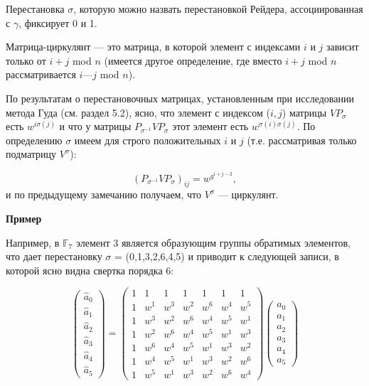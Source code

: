 \documentclass{mai_book}
\begin{document}
\begin{mynotice}
Перестановка $\sigma$, которую можно назвать перестановкой Рейдера, ассоциированная с $\gamma$, фиксирует 0 и 1.\par
Матрица-циркулянт --- это матрица, в которой элемент с индексами $i$ и $j$ зависит только от $i + j$ mod $n$ (имеется другое определение, где вместо $i + j$ mod $n$ рассматривается $i — j$ mod $n$).
\end{mynotice}
\par 
\begin{myproof}
По результатам о перестановочных матрицах, установленным при исследовании метода Гуда (см. раздел 5.2), ясно, что элемент с индексом ($i,j$) матрицы $VP_{\sigma}$ есть $w^{i \sigma (j)}$ и что у матрицы $P_{\sigma^{-1}}VP_{\sigma}$ этот элемент есть $w^{\sigma (i) \sigma (j)}$. По определению $\sigma$ имеем для строго положительных $i$ и $j$ (т.е. рассматривая только подматрицу $V^{\sigma}$):\par 
$$(P_{\sigma^{-1}}VP_{\sigma})_{ij}=w^{g^{i+j-2}},$$ и по предыдущему замечанию получаем, что $V^{\sigma}$ --- циркулянт.
\end{myproof}
\begin{beznomera}
  \textbf{Пример}
  \end{beznomera}
Например, в $\mathbb{F}_7$ элемент 3 является образующим группы обратимых элементов, что дает перестановку $\sigma$ = (0,1,3,2,6,4,5) и приводит к следующей записи, в которой ясно видна свертка порядка 6:\par
$$ \begin{pmatrix}
  \hat{a}_0 \\ \hat{a}_1 \\ \hat{a}_2 \\ \hat{a}_3 \\ \hat{a}_4 \\ \hat{a}_5 \end{pmatrix} = \begin{pmatrix} 1 & 1 & 1 & 1 & 1 & 1 & 1 \\ 1 & w^1 & w^3 & w^2 & w^6 & w^4 & w^5 \\ 1 & w^3 & w^2 & w^6 & w^4 & w^5 & w^1 \\ 1 & w^2 & w^6 & w^4 & w^5 & w^1 & w^3 \\ 1 & w^6 & w^4 & w^5 & w^1 & w^3 & w^2 \\ 1 & w^4 & w^5 & w^1 & w^3 & w^2 & w^6 \\ 1 & w^5 & w^1 & w^3 & w^2 & w^6 & w^4 \end{pmatrix} \begin{pmatrix} a_0 \\ a_1 \\ a_2 \\ a_3 \\ a_4 \\ a_5 \end{pmatrix}$$
\end{document}
